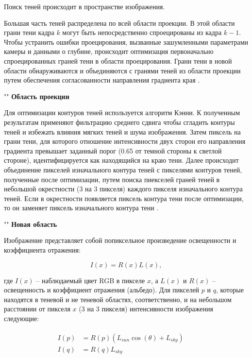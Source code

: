Поиск теней происходит в пространстве изображения. 

Большая часть теней распределена по всей области проекции. В этой области грани тени кадра $k$ могут быть непосредственно спроецированы из кадра $k - 1$. Чтобы устранить ошибки проецирования, вызванные зашумленными параметрами камеры и данными о глубине, происходит оптимизация первоначально спроецированных граней тени в области проецирования. Грани тени в новой области обнаруживаются и объединяются с гранями теней из области проекции путем обеспечения согласованности направления градиента края \cite{wei2019simulating}.

""\newline
\indent\textbf{Область проекции}

Для оптимизации контуров теней используется алгоритм Кэнни. К полученным результатам применяют фильтрацию среднего сдвига чтобы сгладить контуры теней и избежать влияния мягких теней и шума изображения. Затем пиксель на грани тени, для которого отношение интенсивности двух сторон его направления градиента превышает заданный порог (0.65 от темной стороны к светлой стороне), идентифицируется как находящийся на краю тени. Далее происходит объединение пикселей изначального контура теней с пикселями контуров теней, полученные после оптимизации, путем поиска пиекселей граней теней в небольшой окрестности (3 на 3 пикселя) каждого пикселя изначального контура теней. Если в окрестности появляется пиксель контура тени после оптимизации, то он заменяет пиксель изначального контура тени \cite{wei2019simulating}.

""\newline
\indent\textbf{Новая область}

Изображение представляет собой попиксельное произведение освещенности и коэффициента отражения: 

\begin{equation}
	I(x) = R(x)L(x), 
\end{equation}

где $I(x)$ -- наблюдаемый цвет RGB в пикселе $x$, а $L(x)$ и $R(x)$ -- освещенность и коэффициент отражения (альбедо). Для пикселей $p$ и $q$, которые находятся в теневой и не теневой областях, соответственно, и на небольшом расстоянии от пикселя $x$ (3 на 3 пикселя) интенсивности изображения следующие:

\begin{equation}
	\begin{aligned}
		\begin{split}
			I(p) &= R(p)(L_{sun} \cos(\theta) + L_{sky}) &&\\
			I(q) &= R(q)L_{sky} &&
		\end{split}
	\end{aligned}
\end{equation}


